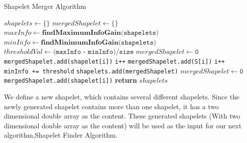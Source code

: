 \documentclass[letterpaper, 10 pt, conference]{IEEEtran}  %
\begin{document}
\begin{algorithm}[H]
  \caption{Shapelet Merger Algorithm}\label{shapeletMerger}
  \begin{algorithmic}[1]
     \State $shapelets \gets \{\}$
     \State $mergedShapelet \gets \{\}$
      \State $maxInfo \gets \textbf{findMaximumInfoGain(} \texttt{shapelets} \textbf{)}$
      \State $minInfo \gets \textbf{findMinimumInfoGain(} \texttt{shapelets} \textbf{)}$
      \State $thresholdVal \gets \texttt{(maxInfo - minInfo)/size}$
      \State $mergedShapelet \gets \texttt{0}$
      \State \texttt{mergedShapelet.add(shapelet[i])}
      \State \texttt{i++}
      \State \texttt{mergedShapelet.add(S[i])}
      \State \texttt{i++}
      \EndIf
        \State \texttt{minInfo += threshold}
        \State \texttt{shapelets.add(mergedShapelet)}
        \State $mergedShapelet \gets \texttt{0}$
       \State \texttt{mergedShapelet.add(shapelet[i])}
        \EndIf
      \EndWhile
      \State \textbf{return} $shapelets$
    \EndProcedure
  \end{algorithmic}
\end{algorithm}


We define a new shapelet, which contains several different shapelets. Since the newly generated shapelet contains more than one shapelet, it has a two dimensional double array as the content. These generated shapelets (With two dimensional double array as the content) will be used as the input for our next algorithm,Shapelet Finder Algorithm.  
\end{document}
